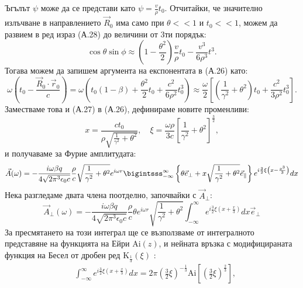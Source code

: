 \begin{appendices}
Ъгълът $\psi$ може да се представи като $\psi = \frac{v}{\rho}t_0$. Отчитайки, че значително излъчване в направлението $\vec{R}_0$ има само при $\theta << 1$ и $t_0 << 1$, можем да развием в ред израз (А.28) до величини от 3ти порядък:
\begin{equation}
	\cos\theta\sin\phi \approx \left(1 - \frac{\theta^2}{2}\right)\frac{v}{\rho}t_0 - \frac{v^3}{6\rho^3}t^3.
\end{equation}
Тогава можем да запишем аргумента на експонентата в (А.26) като:
\begin{equation*}
	\omega\left(t_0 - \frac{\vec{R}_0\cdot\vec{r}_0}{c}\right) = \omega\left(t_0(1-\beta) + \frac{\theta^2}{2}t_0 + \frac{c^2}{6\rho^2}t_0^3\right)\approx\frac{\omega}{2}\left[\left(\frac{1}{\gamma^2} + \theta^2\right)t_0 + \frac{c^2}{3\rho^2}t_0^3\right].
\end{equation*}
Заместваме това и (А.27) в (А.26), дефинираме новите променливи:
\begin{equation}
	x = \frac{ct_0}{\rho\sqrt{\frac{1}{\gamma^2} + \theta^2}},\quad \xi = \frac{\omega\rho}{3c}\left[\frac{1}{\gamma^2} + \theta^2\right]^{\frac{3}{2}},
\end{equation}
и получаваме за Фурие амплитудата:
\begin{equation}
	\vec{A}(\omega) = -\frac{i\omega\beta q}{4\sqrt{2\pi^3\epsilon_0 c}}\frac{\rho}{c}\sqrt{\frac{1}{\gamma^2}+\theta^2}e^{i\omega r}\bigintsss_{-\infty}^\infty\left\{\theta \vec{e}_\perp + x\sqrt{\frac{1}{\gamma^2} + \theta^2}\vec{e}_\parallel\right\}e^{i\frac{3}{2}\xi\left(x - \frac{x^3}{3}\right)}dx
\end{equation}
Нека разгледаме двата члена поотделно, започвайки с $\vec{A}_\perp$:
\begin{equation}
	\vec{A}_\perp(\omega)=-\frac{i\omega\beta q}{4\sqrt{2\pi^3\epsilon_0 c}}\frac{\rho}{c}\theta e^{i\omega r}\sqrt{\frac{1}{\gamma^2}+\theta^2}\int_{-\infty}^\infty e^{i\frac{3}{2}\xi\left(x + \frac{x}{3}\right)}dx \vec{e}_\perp
\end{equation}
За пресмятането на този интеграл ще се възползваме от интегралното представяне на функцията на Ейри $\text{Ai}(z)$, и нейната връзка с модифицираната функция на Бесел от дробен ред $\text{K}_{\frac{1}{3}}(\xi)$ \cite{abramowitz1965}:
\begin{equation}
	\begin{split}
	&\int_{-\infty}^\infty e^{i\frac{3}{2}\xi\left(x + \frac{x}{3}\right)}dx = 2\pi\left(\frac{3}{2}\xi\right)^{-\frac{1}{3}}\text{Ai}\left[\left(\frac{3}{2}\xi\right)^{\frac{2}{3}}\right],\\

\end{split}
\end{equation}
\end{appendices}
